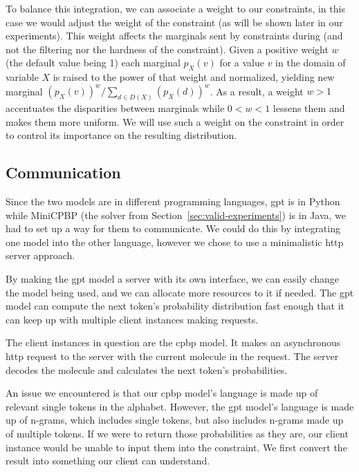 \documentclass[../Document.tex]{subfiles}
\begin{document}
To balance this integration, we can associate a weight to our constraints, in this case we would adjust the weight of the \oracle constraint (as will be shown later in our experiments).
This weight affects the marginals sent by constraints during \bp (and not the filtering nor the hardness of the constraint).
Given a positive weight $w$ (the default value being 1) each marginal $p_X(v)$ for a value $v$ in the domain of variable $X$ is raised to the power of that weight and normalized, yielding new marginal $(p_X(v))^w / \sum_{d \in D(X)} (p_X(d))^w$.
As a result, a weight $w>1$ accentuates the disparities between marginals
while $0 < w < 1$ lessens them and makes them more uniform.
We will use such a weight on the \oracle constraint in order to control its importance on the resulting distribution.


\subsection{Communication}
Since the two models are in different programming languages, \gls{gpt} is in Python while MiniCPBP (the solver from Section~\ref{sec:valid-experiments}) is in Java, we had to set up a way for them to communicate.
We could do this by integrating one model into the other language, however we chose to use a minimalistic \gls{http} server approach.

By making the \gls{gpt} model a server with its own interface, we can easily change the model being used, and we can allocate more resources to it if needed.
The \gls{gpt} model can compute the next token's probability distribution fast enough that it can keep up with multiple client instances making requests.

The client instances in question are the \gls{cpbp} model. It makes an asynchronous \gls{http} request to the server with the current molecule in the request. The server decodes the molecule and calculates the next token's probabilities.

An issue we encountered is that our \gls{cpbp} model's language is made up of relevant single tokens in the \smiles alphabet.
However, the \gls{gpt} model's language is made up of n-grams, which includes single tokens, but also includes n-grams made up of multiple tokens.
If we were to return those probabilities as they are, our client instance would be unable to input them into the \oracle constraint.
We first convert the result into something our client can understand.
\end{document}
